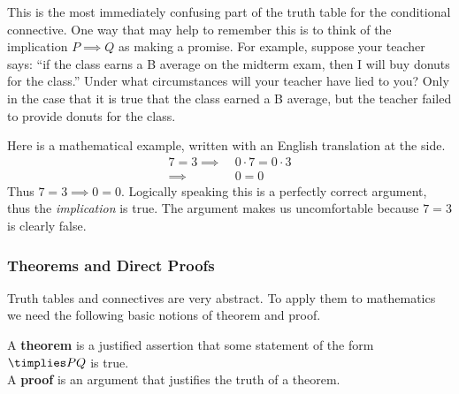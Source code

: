 \begin{aside}

This is the most immediately confusing part of the truth table for the conditional connective. One way that may help to remember this is to think of the implication $P \implies Q$ as making a promise. For example, suppose your teacher says: ``if the class earns a B average on the midterm exam, then I will buy donuts for the class.'' Under what circumstances will your teacher have lied to you? Only in the case that it is true that the class earned a B average, but the teacher failed to provide donuts for the class. 

Here is a mathematical example, written with an English translation at the side.
\begin{align*}
7=3\implies\ &0\cdot 7=0\cdot 3\tag*{(If $7=3$, then 0 times 7 equals 0 times 3)}\\
\implies\ &0=0\tag*{(then 0 equals 0)}
\end{align*}
Thus $7=3\implies 0=0$. Logically speaking this is a perfectly correct argument, thus the \emph{implication} is true. The argument makes us uncomfortable because $7=3$ is clearly false.



\end{aside}


\subsubsection*{Theorems and Direct Proofs}

Truth tables and connectives are very abstract. To apply them to mathematics we need the following basic notions of theorem and proof.

\begin{defn}
A \textbf{theorem} is a justified assertion that some statement of the form $\timplies PQ$ is true.\\
A \textbf{proof} is an argument that justifies the truth of a theorem.
\end{defn}

